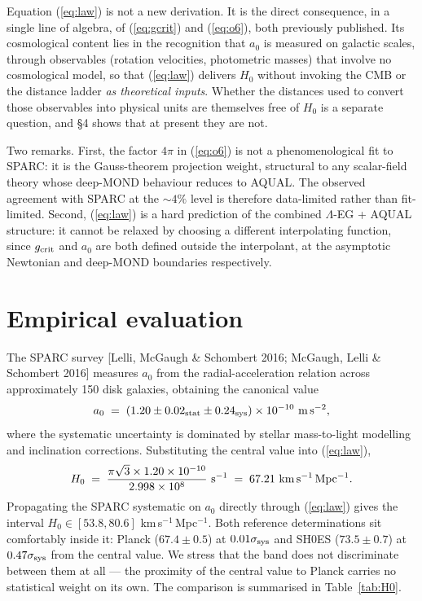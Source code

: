 \documentclass[11pt,a4paper]{article}
\begin{document}
Equation (\ref{eq:law}) is not a new derivation. It is the direct
consequence, in a single line of algebra, of (\ref{eq:gcrit}) and
(\ref{eq:o6}), both previously published. Its cosmological content lies in
the recognition that $a_0$ is measured on galactic scales, through
observables (rotation velocities, photometric masses) that involve no
cosmological model, so that (\ref{eq:law}) delivers $H_0$ without invoking
the CMB or the distance ladder \emph{as theoretical inputs}. Whether the
distances used to convert those observables into physical units are
themselves free of $H_0$ is a separate question, and \S4 shows that at
present they are not.

Two remarks. First, the factor $4\pi$ in (\ref{eq:o6}) is not a phenomenological
fit to SPARC: it is the Gauss-theorem projection weight, structural to any
scalar-field theory whose deep-MOND behaviour reduces to AQUAL. The observed
agreement with SPARC at the $\sim 4\%$ level is therefore data-limited rather
than fit-limited. Second, (\ref{eq:law}) is a hard prediction of the
combined $\Lambda$-EG + AQUAL structure: it cannot be relaxed by choosing a
different interpolating function, since $g_{\rm crit}$ and $a_0$ are both
defined outside the interpolant, at the asymptotic Newtonian and deep-MOND
boundaries respectively.

\section{Empirical evaluation}

The SPARC survey [Lelli, McGaugh \& Schombert 2016; McGaugh, Lelli \&
Schombert 2016] measures $a_0$ from the radial-acceleration relation across
approximately 150 disk galaxies, obtaining the canonical value
\begin{equation}
a_0 \;=\; (1.20 \pm 0.02_{\rm stat} \pm 0.24_{\rm sys})
\times 10^{-10}\ {\rm m\,s^{-2}},
\label{eq:a0sparc}
\end{equation}
where the systematic uncertainty is dominated by stellar mass-to-light
modelling and inclination corrections. Substituting the central value into
(\ref{eq:law}),
\begin{equation}
H_0 \;=\; \frac{\pi\sqrt{3}\times 1.20\times 10^{-10}}{2.998\times 10^{8}}\
{\rm s^{-1}}
\;=\; 67.21\ {\rm km\,s^{-1}\,Mpc^{-1}}.
\label{eq:H0central}
\end{equation}
Propagating the SPARC systematic on $a_0$ directly through (\ref{eq:law})
gives the interval $H_0 \in [53.8, 80.6]$ km\,s$^{-1}$\,Mpc$^{-1}$. Both
reference determinations sit comfortably inside it: Planck ($67.4 \pm 0.5$)
at $0.01\sigma_{\rm sys}$ and SH0ES ($73.5 \pm 0.7$) at $0.47\sigma_{\rm sys}$
from the central value. We stress that the band does not discriminate between
them at all --- the proximity of the central value to Planck carries no
statistical weight on its own. The comparison is summarised in
Table~\ref{tab:H0}.
\end{document}
